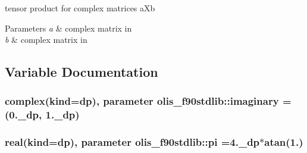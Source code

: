 tensor product for complex matrices a\+Xb 


\begin{DoxyParams}{Parameters}
{\em a} & complex matrix in \\
\hline
{\em b} & complex matrix in \\
\hline
\end{DoxyParams}


\subsection{Variable Documentation}
\subsubsection[{\texorpdfstring{imaginary}{imaginary}}]{\setlength{\rightskip}{0pt plus 5cm}complex(kind=dp), parameter olis\+\_\+f90stdlib\+::imaginary =(0.\+\_\+dp, 1.\+\_\+dp)}\hypertarget{namespaceolis__f90stdlib_a0a22d30625256a14acc49cd749e88cb7}{}\label{namespaceolis__f90stdlib_a0a22d30625256a14acc49cd749e88cb7}
\subsubsection[{\texorpdfstring{pi}{pi}}]{\setlength{\rightskip}{0pt plus 5cm}real(kind=dp), parameter olis\+\_\+f90stdlib\+::pi =4.\+\_\+dp$\ast$atan(1.)}\hypertarget{namespaceolis__f90stdlib_a106e09303fbf05972f0635ff67f73c9d}{}\label{namespaceolis__f90stdlib_a106e09303fbf05972f0635ff67f73c9d}
